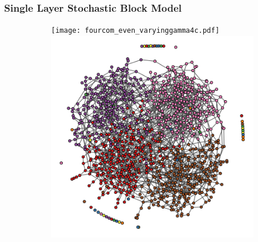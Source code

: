 \documentclass[11pt]{article}
\begin{document}
\subsubsection{Single Layer Stochastic Block Model}
\begin{figure}[!htb]
\centering
\begin{subfigure}{\textwidth}
	\begin{mdframed}
		\texttt{[image: fourcom\_even\_varyinggamma4c.pdf]}
		\includegraphics[width = .24\textwidth]{igraph_even_commlayout4c.pdf}
		\hspace{-.2in}
		\begin{minipage}[c]{0.001\textwidth}
		\caption{ \label{fig:igeven}}
		\end{minipage}%
	\end{mdframed}
\end{subfigure}%


\end{figure}
\end{document}
